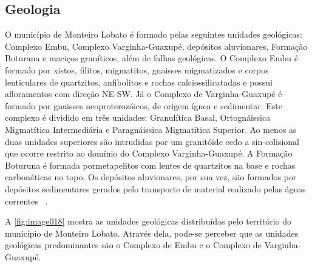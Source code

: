 \subsection{Geologia}

O município de Monteiro Lobato é formado pelas seguintes unidades geológicas: Complexo Embu, Complexo Varginha-Guaxupé, depósitos aluvionares, Formação Boturana e maciços graníticos, além de falhas geológicas. O Complexo Embu é formado por xistos, filitos, migmatitos, gnaisses migmatizados e corpos lenticulares de quartzitos, anfibolitos e rochas calciossilicatadas e possui afloramentos com direção NE-SW. Já o Complexo de Varginha-Guaxupé é formado por gnaisses neoproterozóicos, de origem ígnea e sedimentar. Este complexo é dividido em três unidades: Granulítica Basal, Ortognáissica Migmatítica Intermediária e Paragnáissica Migmatítica Superior.  Ao menos as duas unidades superiores são intrudidas por um granitóide cedo a sin-colisional que ocorre restrito ao domínio do Complexo Varginha-Guaxupé. A Formação Boturuna é formada pormetapelitos com lentes de quartzitos na base e rochas carbonáticas no topo. Os depósitos aluvionares, por sua vez, são formados por depósitos sedimentares gerados pelo transporte de material realizado pelas águas correntes ~\cite{CPRM}.

A \autoref{fig:image018} mostra as unidades geológicas distribuídas pelo território do município de Monteiro Lobato. Através dela, pode-se perceber que as unidades geológicas predominantes são o Complexo de Embu e o Complexo de Varginha-Guaxupé.

